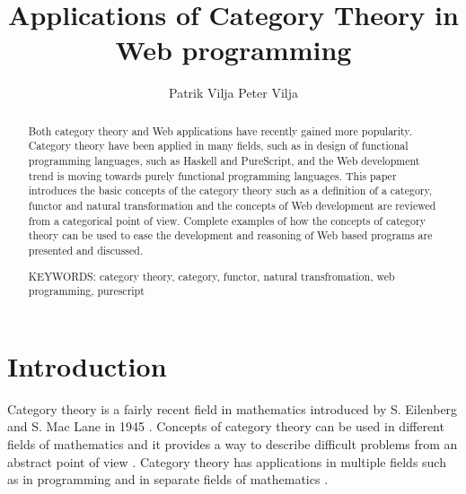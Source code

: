 \documentclass[article]{aaltoseries}
\begin{document}
 

\title{Applications of Category Theory in Web programming}

\author{Patrik Vilja Peter Vilja} %


\maketitle


\begin{abstract}
  Both category theory and Web applications have recently gained more popularity. Category theory have been applied in many fields, such as in design of functional programming languages, such as Haskell and PureScript, and the Web development trend is moving towards purely functional programming languages. This paper introduces the basic concepts of the category theory such as a definition of a category, functor and natural transformation and the concepts of Web development are reviewed from a categorical point of view. Complete examples of how the concepts of category theory can be used to ease the development and reasoning of Web based programs are presented and discussed.

\vspace{3mm}
\noindent KEYWORDS: category theory, category, functor, natural transfromation, web programming, purescript 

\end{abstract}



\section{Introduction}

  Category theory is a fairly recent field in mathematics introduced by S.
  Eilenberg and S. Mac Lane in 1945 \cite{eilenberg1945general,
    awodey2006category}. Concepts of category theory can be used in different
  fields of mathematics and it provides a way to describe difficult problems
  from an abstract point of view \cite{eilenberg1945general, mclarty2007last}.
  Category theory has applications in multiple fields such as in programming and
  in separate fields of mathematics \cite{awodey2006category, reynolds1980using,
    jones1993glasgow}. 
\end{document}
